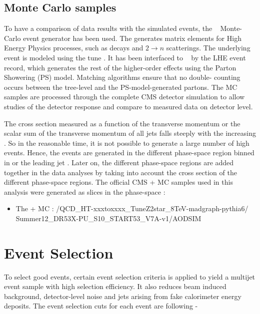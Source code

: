 \subsection{Monte Carlo samples}
To have a comparison of data results with the simulated events, the \MadGraphF~\cite{Alwall:2011uj} Monte-Carlo event generator has been 
used. The \MadGraphF generates matrix elements for High Energy Physics processes, such as decays and $2 \rightarrow n$ scatterings. The 
underlying event is modeled using the tune \Ztwostar. It has been interfaced to \PYTHIAS~\cite{Sjostrand:2006za} by the LHE event record, 
which generates the rest of the higher-order effects using the Parton Showering (PS) model. Matching algorithms ensure that no double-
counting occurs between the tree-level and the PS-model-generated partons. The MC samples are processed through the complete CMS detector 
simulation to allow studies of the detector response and compare to measured data on detector level.

The cross section measured as a function of the transverse momentum \pt or the scalar sum of the transverse momentum of all jets \HT falls 
steeply with the increasing \pt. So in the reasonable time, it is not possible to generate a large number of high \pt events. Hence, the 
events are generated in the different phase-space region binned in \HT or the leading jet \pt. Later on, the different phase-space regions 
are added together in the data analyses by taking into account the cross section of the different phase-space regions. The official CMS 
\MadGraphF + \PYTHIAS MC samples used in this analysis were generated as slices in the \HT phase-space :
\begin{center}
\begin{itemize}
\item The \MadGraphF + \PYTHIAS MC : /QCD\_HT-xxxtoxxxx\_TuneZ2star\_8TeV-madgraph-pythia6/\\Summer12\_DR53X-PU\_S10\_START53\_V7A-v1/AODSIM
\end{itemize}
\end{center}

\section{Event Selection}
To select good events, certain event selection criteria is applied to yield a multijet event 
sample with high selection efficiency. It also reduces beam induced background, detector-level noise and jets arising 
from fake calorimeter energy deposits. The event selection cuts for each event are following -

